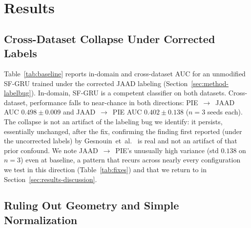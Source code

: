 
\section{Results}
\label{sec:results}

\subsection{Cross-Dataset Collapse Under Corrected Labels}
\label{sec:results-collapse}

Table~\ref{tab:baseline} reports in-domain and cross-dataset AUC for an
unmodified SF-GRU trained under the corrected JAAD labeling
(Section~\ref{sec:method-labelbug}). In-domain, SF-GRU is a competent
classifier on both datasets. Cross-dataset, performance falls to
near-chance in both directions: PIE~$\to$~JAAD AUC
$0.498\pm0.009$ and JAAD~$\to$~PIE AUC $0.402\pm0.138$ ($n=3$ seeds
each). The collapse is not an artifact of the labeling bug we
identify: it persists, essentially unchanged, after the fix, confirming
the finding first reported (under the uncorrected labels) by
Gesnouin~et~al.~\cite{gesnouin2022} is real and not an artifact of that
prior confound. We note JAAD~$\to$~PIE's unusually high variance
(std $0.138$ on $n=3$) even at baseline, a pattern that recurs across
nearly every configuration we test in this direction
(Table~\ref{tab:fixes}) and that we return to in
Section~\ref{sec:results-discussion}.

\subsection{Ruling Out Geometry and Simple Normalization}
\label{sec:results-geometry}

